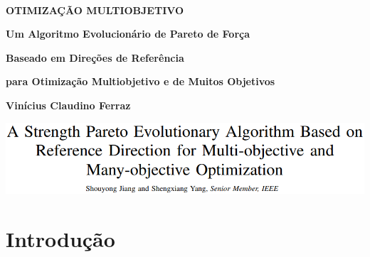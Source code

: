 \documentclass{rbfin}
\begin{document}
\shorttitle{$\,$} %
\rbfe{}
\autor{$\,$}

$\,$

\vspace{30mm}

\Huge

\begin{center}
\textbf{OTIMIZAÇÃO MULTIOBJETIVO}

\vspace{30mm}

\textbf{Um Algoritmo Evolucionário de Pareto de Força}

\vspace{6mm}

\textbf{Baseado em Direções de Referência}

\vspace{6mm}

\textbf{para Otimização Multiobjetivo e de Muitos Objetivos}
\end{center}

\vspace{40mm}

\Large

\begin{flushright}
\textbf{Vinícius Claudino Ferraz}
\end{flushright}

\newpage

\large

\doublespacing

\begin{center}
\includegraphics[scale=1]{artigo}
\end{center}

\section{Introdução}

\vspace{6mm}
\end{document}
